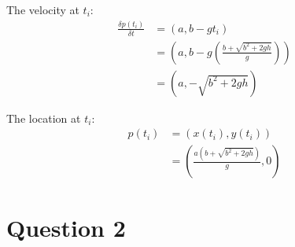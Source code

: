 \documentclass{article} %
\begin{document}
\begin{enumerate}[a)]
The velocity at $t_i$:
\begin{align*}
\frac{\delta p(t_i)}{\delta t} &= (a, b - gt_i)\\
&= \left(a, b - g\left(\frac{b + \sqrt{b^2 + 2gh} }{g}\right)\right)\\
&= \left(a, -\sqrt{b^2 + 2gh}\right)
\end{align*}

The location at $t_i$:
\begin{align*}
p(t_i) &= (x(t_i), y(t_i))\\
&= \left(\frac{a(b + \sqrt{b^2 + 2gh}) }{g}, 0\right)
\end{align*}

\end{enumerate}



\section{Question 2}
\end{document}
